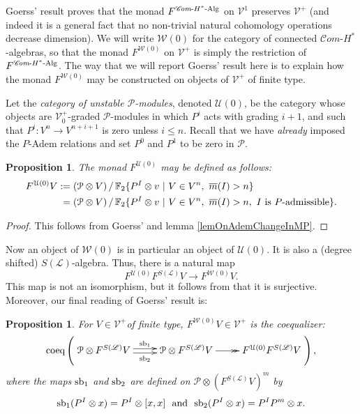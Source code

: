 \documentclass[11pt]{amsart}
\theoremstyle{plain}
\newtheorem{prop}[thm]{Proposition}
\theoremstyle{definition}
\renewcommand{\to}{\longrightarrow}
\newcommand{\scrL}{\mathscr{L}}
\newcommand{\scrC}{\mathscr{C}}
\newcommand{\calU}{\mathcal{U}}
\newcommand{\calP}{\mathcal{P}}
\newcommand{\calV}{\mathcal{V}}
\newcommand{\calw}{\mathcal{W}}
\newcommand{\calu}{\mathcal{U}}
\theoremstyle{plain}
\newcommand{\Palg}{{\calP}}
\newcommand{\LieOperad}{{\scrL}}
\newcommand{\vect}[2]{\calV^{#1}_{#2}}
\newcommand{\HAlg}{\textup{-$H^*$-Alg}}
\newcommand{\minDimP}{\overline{m}}
\newcommand{\F}{\mathbb{F}}
\newcommand{\algs}{{\scrC\!\textit{om}}}
\newcommand{\Ftwo}{\F_2}
\begin{document}
\begin{Constructing (co)homotopy operations}
Goerss' result proves that the monad
$F^{\algs\HAlg}$ on $\vect{1}{}$
preserves $\vect{+}{}$ (and indeed it is a general fact that no non-trivial natural cohomology operations decrease dimension).
We will write $\calw(0)$ for the category of connected $\algs$-$H^*$-algebras, so that the monad $F^{\calw(0)}$ on $\vect{+}{}$ is simply the restriction of $F^{\algs\HAlg}$. The way that we will report Goerss' result here is to explain how the monad $F^{\calw(0)}$ may be constructed on objects of $\vect{+}{}$ of finite type.

Let the \emph{category of unstable $\Palg$-modules}, denoted $\calU(0)$, be the category whose objects are $\vect{+}{0}$-graded $\Palg$-modules in which $P^i$ acts with grading $i+1$, and such that $P^i:V^n\to V^{n+i+1}$ is zero unless $i\leq n$. Recall that  we have \emph{already} imposed the $P$-Adem relations and set $P^0$ and $P^1$ to be zero in $\Palg$. 
\begin{prop}
The monad $F^{\calU(0)}$ may be defined as follows:
\begin{alignat*}{2}
F^{\calU(0)}V
:={}&
(\Palg\otimes V)\,/\,\Ftwo \{P^I\otimes v\ |\ V\in V^n,\ \minDimP(I)>n \}%
\\
={}&
(\Palg\otimes V)\,/\,\Ftwo \{P^I\otimes v\ |\ V\in V^n,\ \minDimP(I)>n ,\ I\textup{ is $P$-admissible}\}.%
\end{alignat*}
\end{prop}
\begin{proof}
This follows from Goerss' \cite[Theorem I]{MR1089001} and lemma \ref{lemOnAdemChangeInMP}.
\end{proof}
Now an object of $\calw(0)$ is in particular an object of $\calU(0)$. It is also a (degree shifted) $S(\LieOperad)$-algebra. Thus, there  is a natural map 
\[F^{\calU(0)}F^{S(\LieOperad)}V\to F^{\calw(0)}V.\]
This map is not an isomorphism, but it follows from \cite[Theorem I]{MR1089001} that it is surjective. Moreover, our final reading of Goerss' result is:
\begin{prop}\label{partialgoerss}
For $V\in\vect{+}{}$of finite type,  $F^{\calw(0)}V\in \vect{+}{}$ is the coequalizer:
\[\textup{coeq}\left(\xymatrix@R=4mm{
\Palg\otimes F^{S(\LieOperad)}V
\ar@<+.5ex>[r]^-{\smash{\textup{sb}_1}}
\ar@<-.5ex>[r]_-{\textup{sb}_2}
&%
\Palg\otimes F^{S(\LieOperad)}V
\ar@{->>}[r]
&
F^{\calu(0)}F^{S(\LieOperad)}V%
}\right),\]
where the maps $\textup{sb}_1$ and $\textup{sb}_2$ are defined on  $\Palg\otimes(F^{S(\LieOperad)}V)^{m}$ by
\[\textup{sb}_1(P^I\otimes x)=P^I\otimes [x,x]\textup{ \ and \ }\textup{sb}_2(P^I\otimes x)=P^IP^m\otimes x.\]

\end{prop}
\end{Constructing (co)homotopy operations}
\end{document}
